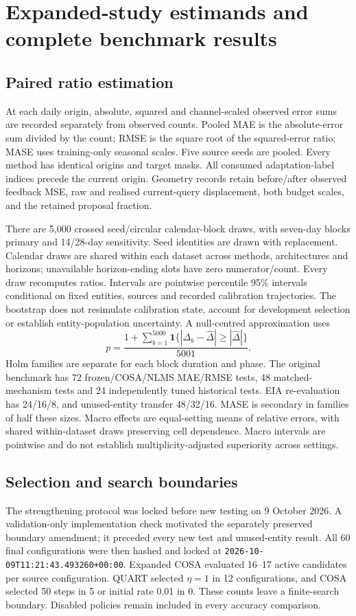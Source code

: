 \documentclass[11pt,a4paper]{article}
\begin{document}
\section{Expanded-study estimands and complete benchmark results}
\subsection{Paired ratio estimation}
At each daily origin, absolute, squared and channel-scaled observed error sums are recorded separately from observed counts. Pooled MAE is the absolute-error sum divided by the count; RMSE is the square root of the squared-error ratio; MASE uses training-only seasonal scales. Five source seeds are pooled. Every method has identical origins and target masks. All consumed adaptation-label indices precede the current origin. Geometry records retain before/after observed feedback MSE, raw and realised current-query displacement, both budget scales, and the retained proposal fraction.

There are 5,000 crossed seed/circular calendar-block draws, with seven-day blocks primary and 14/28-day sensitivity. Seed identities are drawn with replacement. Calendar draws are shared within each dataset across methods, architectures and horizons; unavailable horizon-ending slots have zero numerator/count. Every draw recomputes ratios. Intervals are pointwise percentile 95\% intervals conditional on fixed entities, sources and recorded calibration trajectories. The bootstrap does not resimulate calibration state, account for development selection or establish entity-population uncertainty. A null-centred approximation uses
\[
 p=\frac{1+\sum_{b=1}^{5000}\mathbf1\{|\Delta_b-\widehat\Delta|\geq|\widehat\Delta|\}}{5001}.
\]
Holm families are separate for each block duration and phase. The original benchmark has 72 frozen/COSA/NLMS MAE/RMSE tests, 48 matched-mechanism tests and 24 independently tuned historical tests. EIA re-evaluation has 24/16/8, and unused-entity transfer 48/32/16. MASE is secondary in families of half these sizes. Macro effects are equal-setting means of relative errors, with shared within-dataset draws preserving cell dependence. Macro intervals are pointwise and do not establish multiplicity-adjusted superiority across settings.

\subsection{Selection and search boundaries}
The strengthening protocol was locked before new testing on 9 October 2026. A validation-only implementation check motivated the separately preserved boundary amendment; it preceded every new test and unused-entity result. All 60 final configurations were then hashed and locked at \texttt{2026-10-09T11:21:43.493260+00:00}. Expanded COSA evaluated 16--17 active candidates per source configuration. QUART selected $\eta=1$ in 12 configurations, and COSA selected 50 steps in 5 or initial rate 0.01 in 0. These counts leave a finite-search boundary. Disabled policies remain included in every accuracy comparison.
\end{document}
